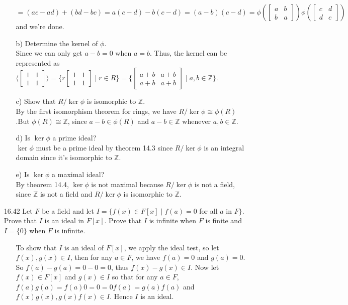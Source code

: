 \documentclass[12pt]{article}
\begin{document}
\begin{enumerate}
\begin{enumerate}
\[\]
\[
= (ac - ad) + (bd - bc) = a(c - d) - b(c - d) = (a - b)(c - d) = 
\phi(\left[ \begin{array}{cc} a & b \\ b & a \end{array} \right])\phi(\left[ \begin{array}{cc} c & d \\ d & c \end{array} \right])
\]
and we're done.
\item[b)] Determine the kernel of $\phi$.\\
Since we can only get $a - b = 0$ when $a = b$. Thus, the kernel can be represented as 
$\langle \left[ \begin{array}{cc} 1 & 1 \\ 1 & 1 \end{array} \right] \rangle = 
\{ r\left[ \begin{array}{cc} 1 & 1 \\ 1 & 1 \end{array} \right] \mid r \in R\} = 
\{ \left[ \begin{array}{cc} a + b & a + b \\ a + b & a + b \end{array} \right] \mid a, b \in \mathbb{Z} \}$.
\item[c)] Show that $R/\ker \phi$ is isomorphic to $\mathbb{Z}$.\\
By the first isomorphism theorem for rings, we have $R/\ker \phi \cong \phi(R)$.But $\phi(R) \cong \mathbb{Z}$,
since $a - b \in \phi(R)$ and $a - b \in \mathbb{Z}$ whenever $a, b \in \mathbb{Z}$.
\item[d)] Is $\ker \phi$ a prime ideal?\\
$\ker \phi$ must be a prime ideal by theorem 14.3 since $R/\ker \phi$ is an integral domain since 
it's isomorphic to $\mathbb{Z}$.
\item[e)] Is $\ker \phi$ a maximal ideal?\\
By theorem 14.4, $\ker \phi$ is not maximal because $R/\ker \phi$ is not a field, since $\mathbb{Z}$ is
not a field and $R/\ker \phi$ is isomorphic to $\mathbb{Z}$.
\end{enumerate}

\item[16.42] Let $F$ be a field and let $I = \{ f(x) \in F[x] \mid f(a) = 0$ for all $a$ in
$F \}$. Prove that $I$ is an ideal in $F[x]$. Prove that $I$ is infinite when $F$ is finite and 
$I = \{ 0 \}$ when $F$ is infinite.
\begin{enumerate}
\item[] To show that $I$ is an ideal of $F[x]$, we apply the ideal test, so let
$f(x), g(x) \in I$, then for any $a \in F$, we have $f(a) = 0$ and $g(a) = 0$.
So $f(a) - g(a) = 0 - 0 = 0$, thus $f(x) - g(x) \in I$. Now let $f(x) \in F[x]$ and 
$g(x) \in I$ so that for any $a \in F$, $f(a)g(a) = f(a)0 = 0 = 0f(a) = g(a)f(a)$ and $f(x)g(x), g(x)f(x) \in I$.
Hence $I$ is an ideal.
\end{enumerate}


\end{enumerate}
\end{document}
